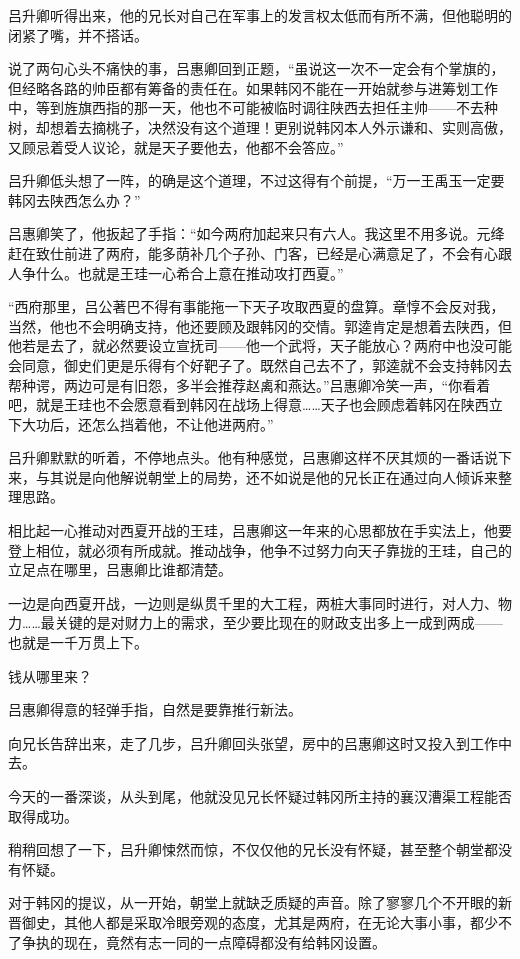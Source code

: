 吕升卿听得出来，他的兄长对自己在军事上的发言权太低而有所不满，但他聪明的闭紧了嘴，并不搭话。

说了两句心头不痛快的事，吕惠卿回到正题，“虽说这一次不一定会有个掌旗的，但经略各路的帅臣都有筹备的责任在。如果韩冈不能在一开始就参与进筹划工作中，等到旌旗西指的那一天，他也不可能被临时调往陕西去担任主帅——不去种树，却想着去摘桃子，决然没有这个道理！更别说韩冈本人外示谦和、实则高傲，又顾忌着受人议论，就是天子要他去，他都不会答应。”

吕升卿低头想了一阵，的确是这个道理，不过这得有个前提，“万一王禹玉一定要韩冈去陕西怎么办？”

吕惠卿笑了，他扳起了手指：“如今两府加起来只有六人。我这里不用多说。元绛赶在致仕前进了两府，能多荫补几个子孙、门客，已经是心满意足了，不会有心跟人争什么。也就是王珪一心希合上意在推动攻打西夏。”

“西府那里，吕公著巴不得有事能拖一下天子攻取西夏的盘算。章惇不会反对我，当然，他也不会明确支持，他还要顾及跟韩冈的交情。郭逵肯定是想着去陕西，但他若是去了，就必然要设立宣抚司——他一个武将，天子能放心？两府中也没可能会同意，御史们更是乐得有个好靶子了。既然自己去不了，郭逵就不会支持韩冈去帮种谔，两边可是有旧怨，多半会推荐赵禼和燕达。”吕惠卿冷笑一声，“你看着吧，就是王珪也不会愿意看到韩冈在战场上得意……天子也会顾虑着韩冈在陕西立下大功后，还怎么挡着他，不让他进两府。”

吕升卿默默的听着，不停地点头。他有种感觉，吕惠卿这样不厌其烦的一番话说下来，与其说是向他解说朝堂上的局势，还不如说是他的兄长正在通过向人倾诉来整理思路。

相比起一心推动对西夏开战的王珪，吕惠卿这一年来的心思都放在手实法上，他要登上相位，就必须有所成就。推动战争，他争不过努力向天子靠拢的王珪，自己的立足点在哪里，吕惠卿比谁都清楚。

一边是向西夏开战，一边则是纵贯千里的大工程，两桩大事同时进行，对人力、物力……最关键的是对财力上的需求，至少要比现在的财政支出多上一成到两成——也就是一千万贯上下。

钱从哪里来？

吕惠卿得意的轻弹手指，自然是要靠推行新法。

向兄长告辞出来，走了几步，吕升卿回头张望，房中的吕惠卿这时又投入到工作中去。

今天的一番深谈，从头到尾，他就没见兄长怀疑过韩冈所主持的襄汉漕渠工程能否取得成功。

稍稍回想了一下，吕升卿悚然而惊，不仅仅他的兄长没有怀疑，甚至整个朝堂都没有怀疑。

对于韩冈的提议，从一开始，朝堂上就缺乏质疑的声音。除了寥寥几个不开眼的新晋御史，其他人都是采取冷眼旁观的态度，尤其是两府，在无论大事小事，都少不了争执的现在，竟然有志一同的一点障碍都没有给韩冈设置。

